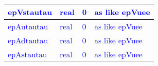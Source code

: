 \documentclass{article}
\begin{document}
\begin{longtable}{llll}
\midrule
\textcolor{blue}{epVstautau} & \begin{minipage}[t]{2cm}\textcolor{blue}{real}\end{minipage} & \begin{minipage}[t]{2cm}\textcolor{blue}{0}\end{minipage} & \begin{minipage}[t]{12cm}\textcolor{blue}{as like epVuee}\end{minipage}\\*
\midrule
\textcolor{blue}{epAutautau} & \begin{minipage}[t]{2cm}\textcolor{blue}{real}\end{minipage} & \begin{minipage}[t]{2cm}\textcolor{blue}{0}\end{minipage} & \begin{minipage}[t]{12cm}\textcolor{blue}{as like epVuee}\end{minipage}\\*
\midrule
\textcolor{blue}{epAdtautau} & \begin{minipage}[t]{2cm}\textcolor{blue}{real}\end{minipage} & \begin{minipage}[t]{2cm}\textcolor{blue}{0}\end{minipage} & \begin{minipage}[t]{12cm}\textcolor{blue}{as like epVuee}\end{minipage}\\*
\midrule
\textcolor{blue}{epAstautau} & \begin{minipage}[t]{2cm}\textcolor{blue}{real}\end{minipage} & \begin{minipage}[t]{2cm}\textcolor{blue}{0}\end{minipage} & \begin{minipage}[t]{12cm}\textcolor{blue}{as like epVuee}\end{minipage}\\*
\bottomrule
\end{longtable}
{ }



\end{document}
